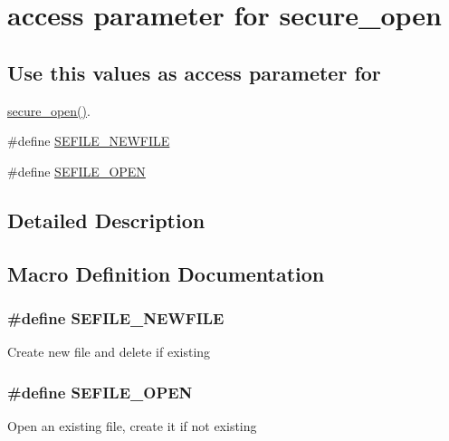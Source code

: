 \hypertarget{group___access___defines}{\section{access parameter for secure\-\_\-open}
\label{group___access___defines}
}
\subsection*{Use this values as access parameter for}
\label{_amgrp2ed59a0e5c494bd4fc39975773a63d09}%
\hyperlink{_s_efile_8c_ae99f8ccb396cbb5685d9e16bb3dbbe98}{secure\-\_\-open()}. \begin{DoxyCompactItemize}
\item 
\#define \hyperlink{group___access___defines_ga57c4f0752b0acce2d45dff73592e09e3}{S\-E\-F\-I\-L\-E\-\_\-\-N\-E\-W\-F\-I\-L\-E}
\item 
\#define \hyperlink{group___access___defines_ga3912e29a65705156f8d2e7ffe7fe80c7}{S\-E\-F\-I\-L\-E\-\_\-\-O\-P\-E\-N}
\end{DoxyCompactItemize}


\subsection{Detailed Description}


\subsection{Macro Definition Documentation}
\hypertarget{group___access___defines_ga57c4f0752b0acce2d45dff73592e09e3}{
\subsubsection[{S\-E\-F\-I\-L\-E\-\_\-\-N\-E\-W\-F\-I\-L\-E}]{\setlength{\rightskip}{0pt plus 5cm}\#define S\-E\-F\-I\-L\-E\-\_\-\-N\-E\-W\-F\-I\-L\-E}}\label{group___access___defines_ga57c4f0752b0acce2d45dff73592e09e3}
Create new file and delete if existing \hypertarget{group___access___defines_ga3912e29a65705156f8d2e7ffe7fe80c7}{
\subsubsection[{S\-E\-F\-I\-L\-E\-\_\-\-O\-P\-E\-N}]{\setlength{\rightskip}{0pt plus 5cm}\#define S\-E\-F\-I\-L\-E\-\_\-\-O\-P\-E\-N}}\label{group___access___defines_ga3912e29a65705156f8d2e7ffe7fe80c7}
Open an existing file, create it if not existing 